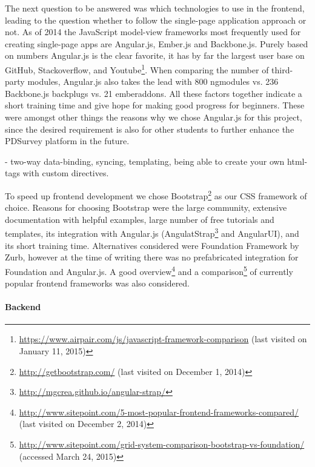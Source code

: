 		The next question to be answered was which technologies to use in the frontend, leading to the question whether to follow the single-page application approach or not. As of 2014 the JavaScript model-view frameworks most frequently used for creating single-page apps are Angular.js, Ember.js and Backbone.js. Purely based on numbers Angular.js is the clear favorite, it has by far the largest user base on GitHub, Stackoverflow, and Youtube\footnote{\url{https://www.airpair.com/js/javascript-framework-comparison} (last visited on January 11, 2015)}. When comparing the number of third-party modules, Angular.js also takes the lead with 800 ngmodules vs. 236 Backbone.js backplugs vs. 21 emberaddons. All these factors together indicate a short training time and give hope for making good progress for beginners. These were amongst other things the reasons why we chose Angular.js for this project, since the desired requirement is also for other students to further enhance the PDSurvey platform in the future.

			- two-way data-binding, syncing, templating, being able to create your own html-tags with custom directives.

		To speed up frontend development we chose Bootstrap\footnote{\url{http://getbootstrap.com/} (last visited on December 1, 2014)} as our CSS framework of choice. Reasons for choosing Bootstrap were the large community, extensive documentation with helpful examples, large number of free tutorials and templates, its integration with Angular.js (AngulatStrap\footnote{\url{http://mgcrea.github.io/angular-strap/}} and AngularUI), and its short training time.
		Alternatives considered were Foundation Framework by Zurb, however at the time of writing there was no prefabricated integration for Foundation and Angular.js.
		A good overview\footnote{\url{http://www.sitepoint.com/5-most-popular-frontend-frameworks-compared/} (last visited on December 2, 2014)} and a comparison\footnote{\url{http://www.sitepoint.com/grid-system-comparison-bootstrap-vs-foundation/} (accessed March 24, 2015)} of currently popular frontend frameworks was also considered.

	

	\paragraph{Backend}

